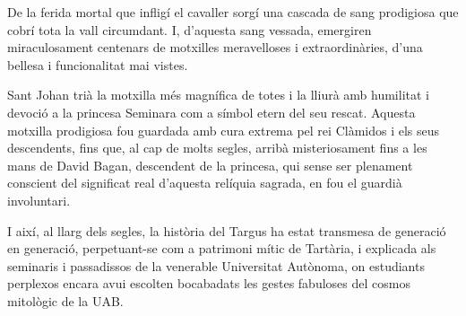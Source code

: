 De la ferida mortal que infligí el cavaller sorgí una cascada de sang prodigiosa que cobrí tota la vall circumdant. I, d’aquesta sang vessada, emergiren miraculosament centenars de motxilles meravelloses i extraordinàries, d’una bellesa i funcionalitat mai vistes.

Sant Johan trià la motxilla més magnífica de totes i la lliurà amb humilitat i devoció a la princesa Seminara com a símbol etern del seu rescat. Aquesta motxilla prodigiosa fou guardada amb cura extrema pel rei Clàmidos i els seus descendents, fins que, al cap de molts segles, arribà misteriosament fins a les mans de David Bagan, descendent de la princesa, qui sense ser plenament conscient del significat real d’aquesta relíquia sagrada, en fou el guardià involuntari.

I així, al llarg dels segles, la història del Targus ha estat transmesa de generació en generació, perpetuant-se com a patrimoni mític de Tartària, i explicada als seminaris i passadissos de la venerable Universitat Autònoma, on estudiants perplexos encara avui escolten bocabadats les gestes fabuloses del cosmos mitològic de la UAB.
